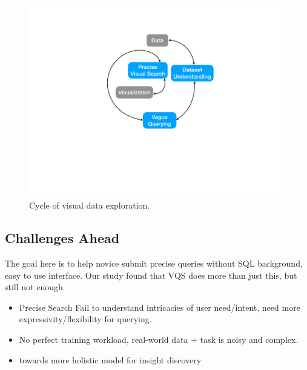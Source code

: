\begin{figure}[h!]
	\label{fig:cycle}
	\centering
	\includegraphics[width=0.5\linewidth]{figures/cycle.pdf}
	\caption{Cycle of visual data exploration.}
\end{figure}

\subsection{Challenges Ahead}
The goal here is to help novice submit precise queries without SQL background, easy to use interface. Our study found that VQS does more than just this, but still not enough.
\begin{itemize}
	\item Precise Search Fail to understand intricacies of user need/intent, need more expressivity/flexibility for querying.
	\item  No perfect training workload, real-world data + task is noisy and complex. 
	\item towards more holistic model for insight discovery
\end{itemize}
